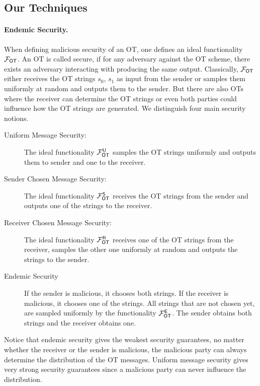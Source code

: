 \subsection{Our Techniques}

\paragraph{Endemic Security.} When defining malicious security of an OT, one defines an ideal functionality $\mathcal{F}_{\mathsf{OT}}$. An OT is called secure, if for any adversary against the OT scheme, there exists an adversary interacting with \OOT producing the same output. Classically, $\mathcal{F}_{\mathsf{OT}}$ either receives the OT strings $s_0$, $s_1$ as input from the sender or samples them uniformly at random and outputs them to the sender. But there are also OTs where the receiver can determine the OT strings or even both parties could influence how the OT strings are generated. We distinguish four main security notions.
\begin{description}
\item[Uniform Message Security:] The ideal functionality $\mathcal{F}_{\mathsf{OT}}^{\mathsf{U}}$ samples the OT strings uniformly and outputs them to sender and one to the receiver.
\item[Sender Chosen Message Security:] The ideal functionality $\mathcal{F}_{\mathsf{OT}}^{\mathsf{S}}$ receives the OT strings from the sender and outputs one of the strings to the receiver.
\item[Receiver Chosen Message Security:] The ideal functionality $\mathcal{F}_{\mathsf{OT}}^{\mathsf{R}}$ receives one of the OT strings from the receiver, samples the other one uniformly at random and outputs the strings to the sender.
\item[Endemic Security] If the sender is malicious, it chooses both strings. If the receiver is malicious, it chooses one of the strings. All strings that are not chosen yet, are sampled uniformly by the functionality $\mathcal{F}_{\mathsf{OT}}^{\mathsf{E}}$. The sender obtains both strings and the receiver obtains one. 
\end{description}

Notice that endemic security gives the weakest security guarantees, no matter whether the receiver or the sender is malicious, the malicious party can always determine the distribution of the OT messages. Uniform message security gives very strong security guarantees since a malicious party can never influence the distribution.
     

